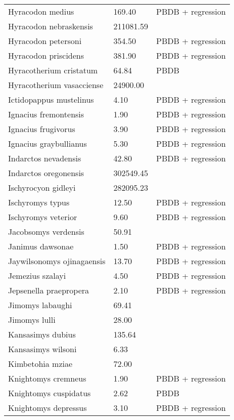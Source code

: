 \documentclass{article}
\begin{document}
\begin{center}
\begin{longtable}{p{} p{} p{}}
    Hyracodon medius & 169.40 & PBDB + regression \\ 
    Hyracodon nebraskensis & 211081.59 & \cite{Tomiya2013} \\ 
    Hyracodon petersoni & 354.50 & PBDB + regression \\ 
    Hyracodon priscidens & 381.90 & PBDB + regression \\ 
    Hyracotherium cristatum & 64.84 & PBDB \\ 
    Hyracotherium vasacciense & 24900.00 & \cite{MacFadden1986} \\ 
    Ictidopappus mustelinus & 4.10 & PBDB + regression \\ 
    Ignacius fremontensis & 1.90 & PBDB + regression \\ 
    Ignacius frugivorus & 3.90 & PBDB + regression \\ 
    Ignacius graybullianus & 5.30 & PBDB + regression \\ 
    Indarctos nevadensis & 42.80 & PBDB + regression \\ 
    Indarctos oregonensis & 302549.45 & \cite{Tomiya2013} \\ 
    Ischyrocyon gidleyi & 282095.23 & \cite{Tomiya2013} \\ 
    Ischyromys typus & 12.50 & PBDB + regression \\ 
    Ischyromys veterior & 9.60 & PBDB + regression \\ 
    Jacobsomys verdensis & 50.91 & \cite{Tomiya2013} \\ 
    Janimus dawsonae & 1.50 & PBDB + regression \\ 
    Jaywilsonomys ojinagaensis & 13.70 & PBDB + regression \\ 
    Jemezius szalayi & 4.50 & PBDB + regression \\ 
    Jepsenella praepropera & 2.10 & PBDB + regression \\ 
    Jimomys labaughi & 69.41 & \cite{Tomiya2013} \\ 
    Jimomys lulli & 28.00 & \cite{McKenna2011} \\ 
    Kansasimys dubius & 135.64 & \cite{Tomiya2013} \\ 
    Kansasimys wilsoni & 6.33 & \cite{Matthew1901} \\ 
    Kimbetohia mziae & 72.00 & \cite{Wilson2012} \\ 
    Knightomys cremneus & 1.90 & PBDB + regression \\ 
    Knightomys cuspidatus & 2.62 & PBDB \\ 
    Knightomys depressus & 3.10 & PBDB + regression \\ 

\end{longtable}
\end{center}
\end{document}

